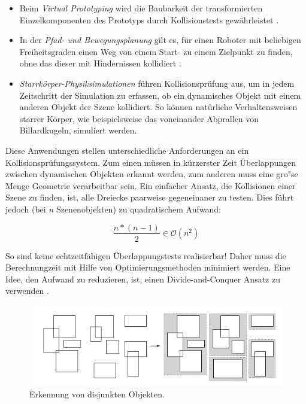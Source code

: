 \begin{itemize}
	\item Beim {\em Virtual Prototyping} wird die Baubarkeit der transformierten
	Einzelkomponenten des Prototyps durch Kollisionstests gew\"ahrleistet
    \cite{zachmannThesis}.
	\item In der {\em Pfad- und Bewegungsplanung} gilt es, f\"ur einen Roboter mit
	beliebigen Freiheitsgraden einen Weg von einem Start- zu einem Zielpunkt zu
	finden, ohne das dieser mit Hindernissen kollidiert \cite{lavalle}.
	\item {\em Starrk\"orper-Physiksimulationen}  f\"uhren Kollisionspr\"ufung aus,
	um in jedem Zeitschritt der Simulation zu erfassen, ob ein dynamisches Objekt mit einem
	anderen Objekt der Szene kollidiert. So k\"onnen nat\"urliche
	Verhaltensweisen starrer K\"orper, wie beispielsweise das voneinander Abprallen
	von Billardkugeln, simuliert werden.
\end{itemize}

Diese Anwendungen stellen unterschiedliche Anforderungen an ein
Kollisionspr\"ufungssystem. Zum einen m\"ussen in k\"urzerster Zeit \"Uberlappungen
zwischen dynamischen Objekten erkannt werden, zum anderen muss eine
gro"se Menge Geometrie verarbeitbar sein. Ein einfacher Ansatz, die Kollisionen
einer Szene zu finden, ist, alle Dreiecke paarweise gegeneinaner
zu testen. Dies f\"uhrt jedoch (bei  {\em n}
Szenenobjekten) zu quadratischem Aufwand:

\begin{equation}
\frac{n*(n-1)}{2} \in \mathcal O(n^2)\label{quad}
\end{equation}

So sind keine echtzeitf\"ahigen \"Uberlappungstests realisierbar! Daher muss die
Berechnungzeit mit Hilfe von Optimierungsmethoden minimiert werden. Eine Idee,
den Aufwand zu reduzieren, ist, einen Divide-and-Conquer Ansatz zu verwenden \cite{Ericson05}. 


\begin{figure}[H]
\centerline{
	\includegraphics[width=0.7\columnwidth]{graphics/box.png}
}
\caption{Erkennung von disjunkten Objekten.}
\label{broadbox}
\end{figure}

